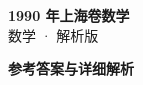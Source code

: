 \documentclass[zihao=-4, a4paper]{ctexart}
\begin{document}
\begin{center}
  {\Large\bfseries 1990 年上海卷数学}\\[4pt]
  {\large 数学 · 解析版}
\end{center}
\medskip
{}

\clearpage
{}
\begin{center}{\Large\bfseries 参考答案与详细解析}\end{center}
\medskip

\end{document}
